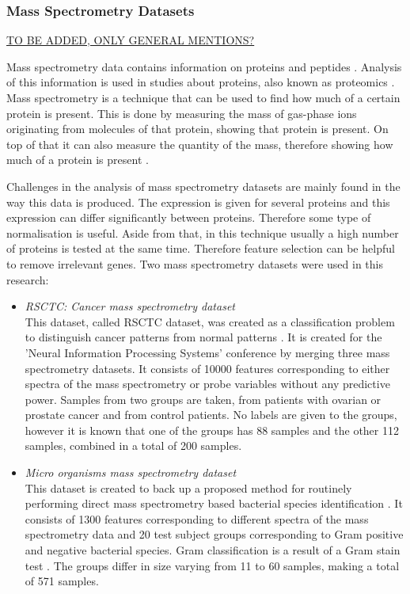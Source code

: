 \documentclass[10pt,a4paper]{report}
\begin{document}
	\subsubsection{Mass Spectrometry Datasets} \underline{TO BE ADDED, ONLY GENERAL MENTIONS?}
	\label{PLsubsec:MassSpect}
	
	Mass spectrometry data contains information on proteins and peptides \cite{cottrell1999probability, dettmer2007mass}. Analysis of this information is used in studies about proteins, also known as proteomics \cite{matthiesen2008analysis}. Mass spectrometry is a technique that can be used to find how much of a certain protein is present. This is done by measuring the mass of gas-phase ions originating from molecules of that protein, showing that protein is present. On top of that it can also measure the quantity of the mass, therefore showing how much of a protein is present \cite{watson2007introduction}.
	
	
	Challenges in the analysis of mass spectrometry datasets are mainly found in the way this data is produced. The expression is given for several proteins and this expression can differ significantly between proteins. Therefore some type of normalisation is useful. Aside from that, in this technique usually a high number of proteins is tested at the same time. Therefore feature selection can be helpful to remove irrelevant genes. Two mass spectrometry datasets were used in this research:
	
	\begin{itemize}
		\item \textit{RSCTC: Cancer mass spectrometry dataset} \\ This dataset, called RSCTC dataset, was created as a classification problem to distinguish cancer patterns from normal patterns \cite{NIPS2004_2728}. It is created for the 'Neural Information Processing Systems' conference by merging three mass spectrometry datasets. It consists of 10000 features corresponding to either spectra of the mass spectrometry or probe variables without any predictive power. Samples from two groups are taken, from patients with ovarian or prostate cancer and from control patients. No labels are given to the groups, however it is known that one of the groups has 88 samples and the other 112 samples, combined in a total of 200 samples.
		\item \textit{Micro organisms mass spectrometry dataset} \\ This dataset is created to back up a proposed method for routinely performing direct mass spectrometry based bacterial species identification \cite{doi:10.1093/bioinformatics/btu022}. It consists of 1300 features corresponding to different spectra of the mass spectrometry data and 20 test subject groups corresponding to Gram positive and negative bacterial species. Gram classification is a result of a Gram stain test \cite{madigan2017brock}. The groups differ in size varying from 11 to 60 samples, making a total of 571 samples.
	\end{itemize}
	
\end{document}
